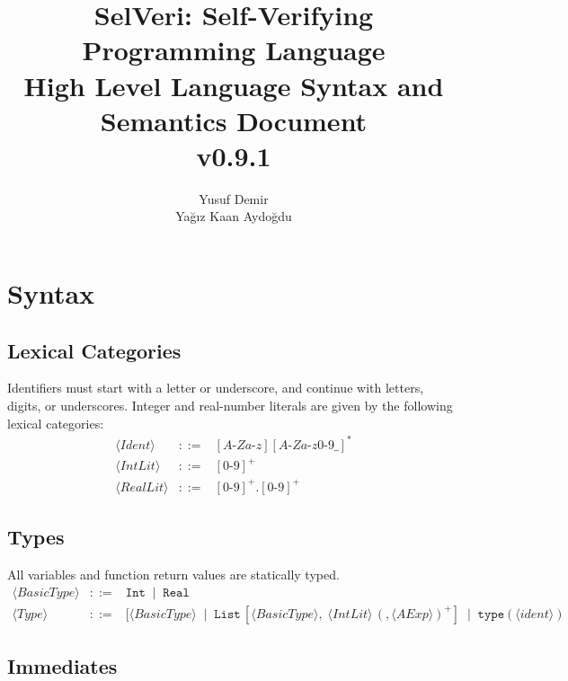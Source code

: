 \documentclass{article}
\title{SelVeri: Self-Verifying Programming Language \\ High Level Language Syntax and Semantics Document \\ v0.9.1}
\author{Yusuf Demir \\ Yağız Kaan Aydoğdu}
\begin{document}
\maketitle


\newpage
\section{Syntax}

\subsection{Lexical Categories}

Identifiers must start with a letter or underscore, and continue with letters, digits, or underscores.
Integer and real-number literals are given by the following lexical categories:
\[
\begin{array}{rcl}
\langle \mathit{Ident} \rangle &::=& [A\texttt{-}Za\texttt{-}z][A\texttt{-}Za\texttt{-}z0\texttt{-}9\_]^* \\
\langle \mathit{IntLit} \rangle &::=& [0\texttt{-}9]^+ \\
\langle \mathit{RealLit} \rangle &::=& [0\texttt{-}9]^+\texttt{.}[0\texttt{-}9]^+
\end{array}
\]

\subsection{Types}

All variables and function return values are statically typed.
\[
\begin{array}{rcl}
\langle \mathit{BasicType} \rangle
&::=&
\mathtt{Int}
\;\mid\;
\mathtt{Real} \\[4pt]



\langle \mathit{Type} \rangle
&::=&
[\langle \mathit{BasicType} \rangle
\;\mid\;
\mathtt{List}\,[\langle \mathit{BasicType} \rangle,\; \langle \mathit{IntLit} \rangle\, (,\langle \mathit{AExp} \rangle)^+]
\;\mid\;
\mathtt{type(\langle \mathit{ident} \rangle)}
\end{array}
\]

\subsection{Immediates}
\end{document}
